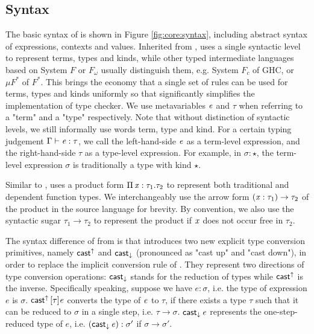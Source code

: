 \subsection{Syntax}\label{sec:core:syn}
The basic syntax of \name is shown in Figure \ref{fig:core:syntax}, including abstract syntax of expressions, contexts and values. Inherited from \cc, \name uses a single syntactic level to represent terms, types and kinds, while other typed intermediate languages based on System $F$ or $F_\omega$ usually distinguish them, e.g. System $F_c$ of GHC, or $\mu F^*$ of $F^*$. This brings the economy that a single set of rules can be used for terms, types and kinds uniformly so that significantly simplifies the implementation of type checker. We use metavariables $\mathit{e}$ and $\tau$ when referring to a "term" and a "type" respectively. Note that without distinction of syntactic levels, we still informally use words term, type and kind. For a certain typing judgement $\Gamma  \vdash  \mathit{e}  :  \tau$, we call the left-hand-side $\mathit{e}$ as a term-level expression, and the right-hand-side $\tau$ as a type-level expression. For example, in $\sigma : \star$, the term-level expression $\sigma$ is traditionally a type with kind $\star$.

Similar to \cc, \name uses a product form $\Pi \, \mathit{x}  :  \tau_{{\mathrm{1}}}  .  \tau_{{\mathrm{2}}}$ to represent both traditional and dependent function types. We interchangeably use the arrow form $(  \mathit{x}  :  \tau_{{\mathrm{1}}}  )  \rightarrow  \tau_{{\mathrm{2}}}$ of the product in the source language for brevity. By convention, we also use the syntactic sugar $\tau_{{\mathrm{1}}}  \longrightarrow  \tau_{{\mathrm{2}}}$ to represent the product if $\mathit{x}$ does not occur free in $\tau_{{\mathrm{2}}}$.

The syntax difference of from \cc is that \expcc introduces two new explicit type conversion primitives, namely $ \mathsf{cast}^{\uparrow} $ and $ \mathsf{cast}_{\downarrow} $ (pronounced as "cast up" and "cast down"), in order to replace the implicit conversion rule of \cc. They represent two directions of type conversion operations: $ \mathsf{cast}_{\downarrow} $ stands for the reduction of types while $ \mathsf{cast}^{\uparrow} $ is the inverse. Specifically speaking, suppose we have $e:\sigma$, i.e. the type of expression $e$ is $\sigma$. $\mathsf{cast}^{\uparrow} \, [  \tau  ]  \mathit{e}$ converts the type of $\mathit{e}$ to $\tau$, if there exists a type $\tau$ such that it can be reduced to $\sigma$ in a single step, i.e. $\tau  \longrightarrow  \sigma$. $\mathsf{cast}_{\downarrow} \, \mathit{e}$ represents the one-step-reduced type of $e$, i.e. $(\mathsf{cast}_{\downarrow} \, \mathit{e}) : \sigma'$ if $\sigma  \longrightarrow  \sigma'$.

